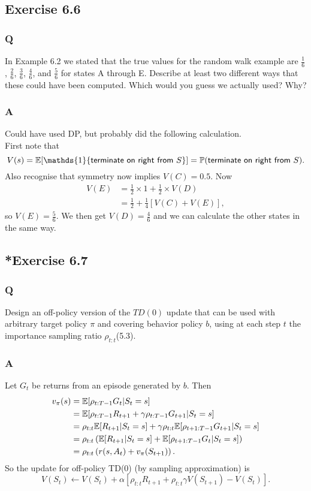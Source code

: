 \subsection{Exercise 6.6}
\subsubsection*{Q}
In Example 6.2 we stated that the true values for the random walk example are $\frac16$, $\frac26$, $\frac36$, $\frac46$, and $\frac56$ for states A through E. Describe at least two different ways that these could have been computed. Which would you guess we actually used? Why?
\subsubsection*{A}
Could have used DP, but probably did the following calculation.\\

First note that
\[
    V(s) = \E{}[\mathds{1}\{\textsf{terminate on right from } S\}] = \P{}(\textsf{terminate on right from } S).
\]
Also recognise that symmetry now implies $V(C) = 0.5$. Now
\begin{align*}
    V(E) &= \frac12 \times 1 + \frac12 \times V(D) \\
         &= \frac12 + \frac14[V(C) + V(E)],
\end{align*}
so $V(E) = \frac56$. We then get $V(D) = \frac46$ and we can calculate the other states in the same way.

\subsection{*Exercise 6.7}
\subsubsection*{Q}
Design an off-policy version of the $TD(0)$ update that can be used with arbitrary target policy $\pi$ and covering behavior policy $b$, using at each step $t$ the importance sampling ratio $\rho_{t:t}$(5.3).
\subsubsection*{A}
Let $G_t$ be returns from an episode generated by $b$. Then
\begin{align*}
    v_\pi(s) &= \mathbb{E}{}[\rho_{t:T-1}G_t | S_t=s]\\
             &= \mathbb{E}{}[\rho_{t:T-1} R_{t+1} + \gamma \rho_{t:T-1}G_{t+1} | S_t=s] \\
             &= \rho_{t:t} \mathbb{E}{}[R_{t+1}|S_t=s] + \gamma \rho_{t:t}\mathbb{E}{}[\rho_{t+1:T-1}G_{t+1} |S_t=s] \\
             &= \rho_{t:t} \left( \mathbb{E}{}[R_{t+1} | S_t=s] + \mathbb{E}{}[\rho_{t+1:T-1}G_t| S_t = s] \right)\\
             &= \rho_{t:t} \left( r(s, A_t) + v_\pi(S_{t+1})\right).
\end{align*}
So the update for off-policy TD(0) (by sampling approximation) is 
\begin{equation}
    V(S_t) \leftarrow V(S_t) + \alpha \left[ \rho_{t:t} R_{t+1} + \rho_{t:t} \gamma V(S_{t+1}) - V(S_t) \right].
\end{equation}

